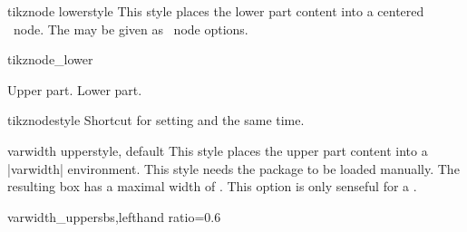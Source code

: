 \begin{docTcbKey}{tikznode lower}{}{style}
  This style places the lower part content into a centered
  \tikzname\ node. The  may be given as \tikzname\  node options.
\begin{exdispExample}{tikznode_lower}
\begin{tcolorbox}[bicolor,colback=LightBlue!50!white,colbacklower=white,
  colframe=black,tikznode lower={inner sep=2pt,draw=red,fill=yellow}]
Upper part.
\tcblower
Lower part.
\end{tcolorbox}
\end{exdispExample}
\end{docTcbKey}

\begin{docTcbKey}{tikznode}{}{style}
  Shortcut for setting  and 
  the same time.
\end{docTcbKey}


\begin{docTcbKey}{varwidth upper}{}{style, default }
  This style places the upper part content into a |varwidth| environment.
  This style needs the  package \cite{arseneau:2011a} to be loaded manually.
  The resulting box has a maximal width of .
  This option is only senseful for a .
\begin{exdispExample*}{varwidth_upper}{sbs,lefthand ratio=0.6}

\end{exdispExample*}
\end{docTcbKey}

\clearpage

